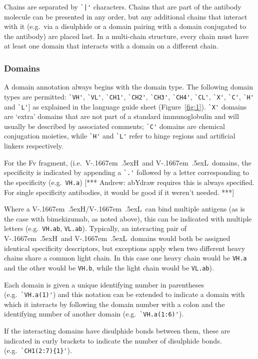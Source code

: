 \documentclass[a4paper]{article}
\newcommand{\VH}{\mbox{V\kern-.1667em \lower.5ex\hbox{\scriptsize H}}}
\newcommand{\VL}{\mbox{V\kern-.1667em \lower.5ex\hbox{\scriptsize L}}}
\newcommand{\VHVL}{\mbox{\VH/\VL}}
\newcommand{\andrew}[1]{{\color{red} [*** Andrew: #1 ***]}}
\begin{document}
Chains are separated by \verb.`|'.
characters. Chains that are part of the antibody molecule can be
presented in any order, but any additional chains that interact with it
(e.g.\ via a disulphide or a domain pairing with a domain conjugated to the antibody)
are placed last. In a multi-chain structure, every chain must have at least one domain
that interacts with a domain on a different chain.

\subsubsection{Domains}
A domain annotation always begins with the domain type.
The following domain types are permitted: 
\verb|`VH'|, \verb|`VL'|,
\verb|`CH1'|, \verb|`CH2'|, \verb|`CH3'|, \verb|`CH4'|, \verb|`CL'|,
\verb|`X'|, \verb|`C'|, \verb|`H'| and \verb|`L'|] as explained in the
language guide sheet (Figure~\ref{fig:1}). 
\verb|`X'| domains are `extra' domains that are not part of a
standard immunoglobulin and will usually be described by associated comments;
\verb|`C'| domains are chemical conjugation moieties, while \verb|`H'|
and \verb|`L'| refer to hinge regions and artificial linkers respectively.

For the Fv fragment, (i.e.\ \VH\ and \VL\ domains, the specificity is
indicated by appending a \verb|`.'| followed by a letter corresponding
to the specificity (e.g.\ \verb|VH.a|)  \andrew{abYdraw requires this
  is always specified. For single specificity antibodies, it would be
  good if it weren't needed.}

Where a \VHVL\ can bind multiple antigens (as is the case with
bimekizumab, as noted above), this can be indicated with multiple
letters (e.g.\ \verb|VH.ab|, \verb|VL.ab|).
Typically, an interacting pair of \VH\ and \VL\ domains
would both be assigned identical specificity descriptors, but
exceptions apply when two different heavy chains share a common light
chain.
In this case one heavy chain would be \verb|VH.a| and the other would
be \verb|VH.b|, while the light chain would be \verb|VL.ab|).


Each domain is given a unique identifying number in parentheses (e.g.\
\verb|`VH.a(1)'|) and this notation can be extended to indicate a domain
with which it interacts by following the domain number with a colon
and the identifying number of another domain (e.g.\
\verb|`VH.a(1:6)'|).

If the interacting domains have disulphide bonds between them, these
are indicated in curly brackets to indicate
the number of disulphide bonds. (e.g.\ \verb|`CH1(2:7){1}'|).
\end{document}
